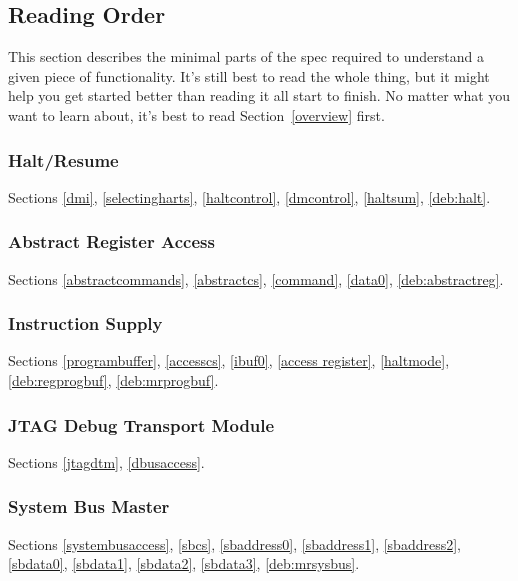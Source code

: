 \documentclass{article}
\begin{document}


\subsection{Reading Order}

This section describes the minimal parts of the spec required to understand a
given piece of functionality. It's still best to read the whole thing, but it
might help you get started better than reading it all start to finish. No
matter what you want to learn about, it's best to read Section~\ref{overview}
first.

\subsubsection{Halt/Resume}

Sections \ref{dmi}, \ref{selectingharts}, \ref{haltcontrol}, \ref{dmcontrol},
\ref{haltsum}, \ref{deb:halt}.

\subsubsection{Abstract Register Access}

Sections \ref{abstractcommands}, \ref{abstractcs}, \ref{command},
\ref{data0}, \ref{deb:abstractreg}.

\subsubsection{Instruction Supply}

Sections \ref{programbuffer}, \ref{accesscs}, \ref{ibuf0}, \ref{access
register}, \ref{haltmode}, \ref{deb:regprogbuf}, \ref{deb:mrprogbuf}.

\subsubsection{JTAG Debug Transport Module}

Sections \ref{jtagdtm}, \ref{dbusaccess}.

\subsubsection{System Bus Master}

Sections \ref{systembusaccess}, \ref{sbcs}, \ref{sbaddress0}, \ref{sbaddress1},
\ref{sbaddress2}, \ref{sbdata0}, \ref{sbdata1}, \ref{sbdata2}, \ref{sbdata3},
\ref{deb:mrsysbus}.
\end{document}
